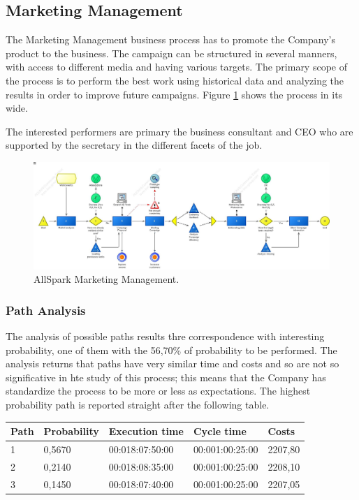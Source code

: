 %

\subsection{Marketing Management}
The Marketing Management business process has to promote the Company's product to the business. The campaign can be structured in several manners, with access to different media and having various targets. The primary scope of the process is to perform the best work using historical data and analyzing the results in order to improve future campaigns. Figure \ref{2img:mark_man} shows the process in its wide.

The interested performers are primary the business consultant and CEO who are supported by the secretary in the different facets of the job.

\begin{figure}[ht!]
\begin{centering}
\includegraphics[scale=0.35, angle=90]{assign2/adonis/imgs/mark_man.jpg}
\caption{AllSpark Marketing Management.}
\label{2img:mark_man}
\end{centering}
\end{figure}


\subsubsection{Path Analysis}
The analysis of possible paths results thre correspondence with interesting probability, one of them with the 56,70\% of probability to be performed. The analysis returns that paths have very similar time and costs and so are not so significative in hte study of this process; this means that the Company has standardize the process to be more or less as expectations. The highest probability path is reported straight after the following table.

\begin{table}
\centering
\begin{tabular}{|l|l|l|l|l|}
Path&Probability&Execution time&Cycle time&Costs\\
\hline
1&0,5670&00:018:07:50:00&00:001:00:25:00&2207,80\\
\hline
2&0,2140&00:018:08:35:00&00:001:00:25:00&2208,10\\
\hline
3&0,1450&00:018:07:40:00&00:001:00:25:00&2207,05
\end{tabular}
\end{table}

